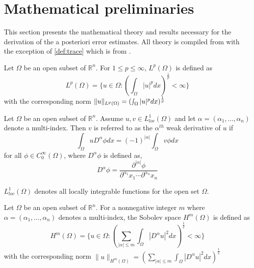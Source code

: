 \section{Mathematical preliminaries}
\label{section:prelim}
This section presents the mathematical theory and results necessary for the derivation of the a posteriori error estimates. All theory is compiled from \cite{verfurth13} with the exception of \ref{def:trace} which is from \cite{riviere}.

\begin{definition}\label{def:LP_space}
Let $\Omega$ be an open subset of $\mathbb{R}^n$. For $1\leq p \leq \infty$, $L^p(\Omega)$ is defined as
\begin{equation}
L^p(\Omega) = \{u \in \Omega : (\int_\Omega |u|^p dx)^\frac{1}{p} < \infty\}
\end{equation}
with the corresponding norm $\|u\|_{L^p(\Omega)} = (\smallint_\Omega |u|^p dx)^\frac{1}{p}$
\end{definition}

\begin{definition}\label{def:weak_derivative}
Let $\Omega$ be an open subset of $\mathbb{R}^n$. Assume $u,v \in L^1_{loc}(\Omega)$ and let $\alpha=(\alpha_1, ..., \alpha_n)$ denote a multi-index. Then $v$ is referred to as the $\alpha^{th}$ weak derivative of $u$ if
\begin{equation}
\int_\Omega u D^\alpha \phi dx = (-1)^{|\alpha|}\int_\Omega v \phi dx
\end{equation}
for all $\phi \in C_0^\infty(\Omega)$, where $D^\alpha \phi$ is defined as, 
\begin{equation}
D^\alpha \phi = \frac{\partial^{|\alpha|}\phi}{\partial^{\alpha_1}x_1 \cdots \partial^{\alpha_n}x_n} 
\end{equation}
\end{definition}
\begin{remark}
$L^1_{loc}(\Omega)$ denotes all locally integrable functions for the open set $\Omega$.
\end{remark}

\begin{definition}\label{def:sobolev}
Let $\Omega$ be an open subset of $\mathbb{R}^n$. For a nonnegative integer $m$ where $\alpha=(\alpha_1, ..., \alpha_n)$ denotes a multi-index, the Sobolev space $H^m(\Omega)$ is defined as
\begin{equation}
H^m(\Omega) = \{u \in \Omega : (\sum_{|\alpha|\leq m} \int_\Omega |D^\alpha u|^2 dx)^\frac{1}{2} < \infty \}
\end{equation}
with the corresponding norm $\|u\|_{H^m(\Omega)}=(\sum_{|\alpha|\leq m} \int_\Omega |D^\alpha u|^2 dx)^\frac{1}{2}$
\end{definition}

